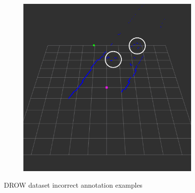 \documentclass{article}
\begin{document}
\begin{figure}[t]
\begin{subfigure}{.5\textwidth}
		\caption{}
		\label{fig:drow_false_positive_1}
	\end{subfigure}%
	\begin{subfigure}{.5\linewidth}
		\centering
		\includegraphics[width=.65\linewidth, height=.65\linewidth]{ftd_nn_false_positive_2}
		\caption{}
		\label{fig:drow_false_positive_2}
	\end{subfigure}
	\caption{DROW dataset incorrect annotation examples}
	\label{fig:drow_nn_annotation_errors}
\end{figure}
\end{document}
